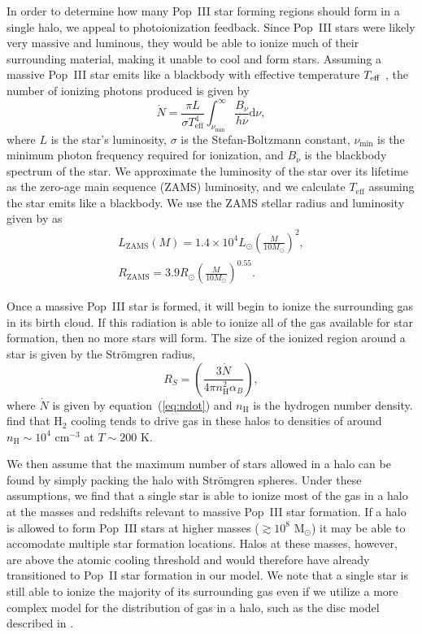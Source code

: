 \documentclass[a4paper,fleqn,usenatbib]{mnras}
\begin{document}
In order to determine how many Pop~III star forming regions should form in a single halo, we appeal to photoionization feedback. Since Pop~III stars were likely very massive and luminous, they would be able to ionize much of their surrounding material, making it unable to cool and form stars. Assuming a massive Pop~III star emits like a 
blackbody 
with effective temperature $T_{\rm eff}$ \citep[see][]{stacy_2012}, the number of ionizing photons produced is given by
\begin{equation}
\dot{N} = \frac{\pi L}{\sigma T_{\text{eff}}^4} 
\int_{\nu_{\text{min}}}^{\infty} \frac{B_{\nu}}{h\nu} \text{d}\nu,
\label{eq:ndot}
\end{equation}
where $L$ is the star's luminosity, $\sigma$ is the Stefan-Boltzmann constant, $\nu_\text{min}$ is the minimum photon frequency required for ionization, and $B_\nu$ is the blackbody spectrum of the star.  We approximate the luminosity of the star over its lifetime as the zero-age main sequence (ZAMS) luminosity, and we calculate $T_\text{eff}$ assuming the star emits like a blackbody.  We use the ZAMS stellar radius and luminosity given by \citet{stacy_2012} as
\begin{align}
L_{\text{ZAMS}}(M) = 1.4 \times 10^4 L_{\odot} \left(\frac{M}{10 M_{\odot}}\right)^2,
\\
R_{\text{ZAMS}} = 3.9 R_{\odot} \left(\frac{M}{10 M_{\odot}} \right)^{0.55}.
\end{align}

Once a massive Pop~III star is formed, it will begin to ionize the surrounding gas in its birth cloud.  If this radiation is able to ionize all of the gas available for star formation, then no more stars will form.  The size of the ionized region around a star is given by the Str\"{o}mgren radius, 
\begin{equation}
R_S = \left( \frac{3 \dot{N}}{4 \pi n^2_\text{H} \alpha_B}\right),
\end{equation}
where $\dot{N}$ is given by equation~(\ref{eq:ndot}) and $n_\text{H}$ is the hydrogen number density. \citet{bromm_2004} find that H$_2$ cooling tends to drive gas in these halos to densities of around 
$n_\text{H} \sim 10^4$ cm$^{-3}$ at $T \sim 200$ K. 

We then assume that the maximum number of stars allowed in a halo can be found by simply packing the halo with Str\"{o}mgren spheres. Under these assumptions, we find that a single star is able to ionize most of the gas in a halo at the masses and redshifts relevant to massive Pop~III star formation. If a halo is allowed to form Pop~III stars at higher masses ($\gtrsim 10^8$ M$_\odot$) it may be able to accomodate multiple star formation locations. Halos at these masses, however, are above the atomic cooling threshold and would therefore have already transitioned to Pop~II star formation in our model. We note that a single star is still able to ionize the majority of its surrounding gas even if we utilize a more complex model for the distribution of gas in a halo, such as the disc model described in \citet{munoz_2013}.
\end{document}
